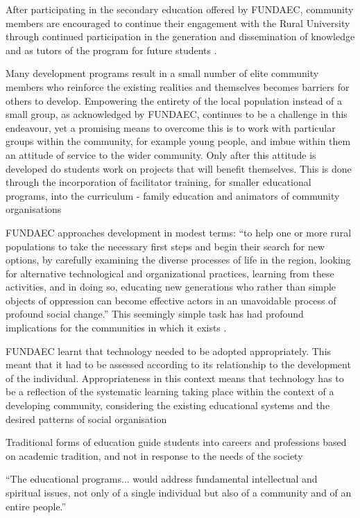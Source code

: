 After participating in the secondary education offered by FUNDAEC, community members are encouraged to continue their engagement with the Rural University through continued participation in the generation and dissemination of knowledge and as tutors of the program for future students \citep{Arbab1988}.

Many development programs result in a small number of elite community members who reinforce the existing realities and themselves becomes barriers for others to develop. Empowering the entirety of the local population instead of a small group, as acknowledged by FUNDAEC, continues to be a challenge in this endeavour, yet a promising means to overcome this is to work with particular groups within the community, for example young people, and imbue within them an attitude of service to the wider community. Only after this attitude is developed do students work on projects that will benefit themselves. This is done through the incorporation of facilitator training, for smaller educational programs, into the curriculum - family education and animators of community organisations \citep{Arbab1988}

FUNDAEC approaches development in modest terms: “to help one or more rural populations to take the necessary first steps and begin their search for new options, by carefully examining the diverse processes of life in the region, looking for alternative technological and organizational practices, learning from these activities, and in doing so, educating new generations who rather than simple objects of oppression can become effective actors in an unavoidable process of profound social change.” This seemingly simple task has had profound implications for the communities in which it exists \citep{Arbab1988}.

FUNDAEC learnt that technology needed to be adopted appropriately. This meant that it had to be assessed according to its relationship to the development of the individual. Appropriateness in this context means that technology has to be a reflection of the systematic learning taking place within the context of a developing community, considering the existing educational systems and the desired patterns of social organisation \citep{Arbab1988}

Traditional forms of education guide students into careers and professions based on academic tradition, and not in response to the needs of the society \citep{Arbab1988}

“The educational programs... would address fundamental intellectual and spiritual issues, not only of a single individual but also of a community and of an entire people.”  \citep[][Section C]{Arbab1988}

